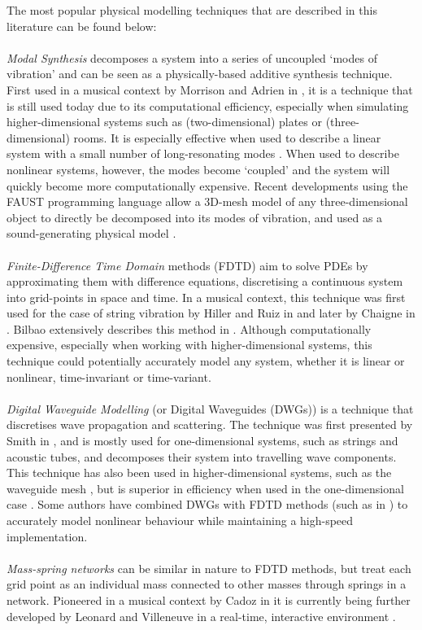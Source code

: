 The most popular physical modelling techniques that are described in this literature can be found below:
\\
\\
\textit{Modal Synthesis} decomposes a system into a series of uncoupled `modes of vibration' and can be seen as a physically-based additive synthesis technique. First used in a musical context by Morrison and Adrien in \cite{Morrison1993}, it is a technique that is still used today due to its computational efficiency, especially when simulating higher-dimensional systems such as (two-dimensional) plates or (three-dimensional) rooms. It is especially effective when used to describe a linear system with a small number of long-resonating modes \cite{Bilbao2018, Smith2010a}. When used to describe nonlinear systems, however, the modes become `coupled’ and the system will quickly become more computationally expensive. Recent developments using the FAUST programming language allow a 3D-mesh model of any three-dimensional object to directly be decomposed into its modes of vibration, and used as a sound-generating physical model \cite{MichonMesh2Faust2017}.
\\
\\
\textit{Finite-Difference Time Domain} methods (FDTD) aim to solve PDEs by approximating them with difference equations, discretising a continuous system into grid-points in space and time. In a musical context, this technique was first used for the case of string vibration by Hiller and Ruiz in \cite{Ruiz1969, Hiller1971I, Hiller1971II} and later by Chaigne in \cite{Chaigne1992, Chaigne1994}. Bilbao extensively describes this method in \cite{theBible, Bilbao2018}. Although computationally expensive, especially when working with higher-dimensional systems, this technique could potentially accurately model any system, whether it is linear or nonlinear, time-invariant or time-variant.
\\
\\
\textit{Digital Waveguide Modelling} (or Digital Waveguides (DWGs)) is a technique that discretises wave propagation and scattering. The technique was first presented by Smith in \cite{Smith1987, Smith1992}, and is mostly used for one-dimensional systems, such as strings and acoustic tubes, and decomposes their system into travelling wave components. This technique has also been used in higher-dimensional systems, such as the waveguide mesh \cite{Duyne1993}, but is superior in efficiency when used in the one-dimensional case \cite{Valimaki2006}. Some authors have combined DWGs with FDTD methods (such as in \cite{Erkut2002, Maestre2014}) to accurately model nonlinear behaviour while maintaining a high-speed implementation.
\\
\\
\textit{Mass-spring networks} can be similar in nature to FDTD methods, but treat each grid point as an individual mass connected to other masses through springs in a network. Pioneered in a musical context by Cadoz in \cite{Cadoz1979, Cadoz1983, Cadoz1993} it is currently being further developed by Leonard and Villeneuve in a real-time, interactive environment \cite{Villeneuve2019, Leonard2019}.

